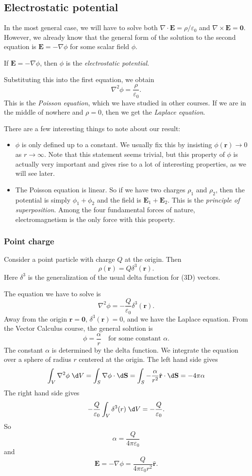 \documentclass[a4paper]{article}
\begin{document}
\subsection{Electrostatic potential}
In the most general case, we will have to solve both $\nabla \cdot \mathbf{E} = \rho/\varepsilon_0$ and $\nabla \times \mathbf{E} = \mathbf{0}$. However, we already know that the general form of the solution to the second equation is $\mathbf{E} = -\nabla\phi$ for some scalar field $\phi$.
\begin{defi}
  If $\mathbf{E} = -\nabla \phi$, then $\phi$ is the \emph{electrostatic potential}.
\end{defi}
Substituting this into the first equation, we obtain
\[
  \nabla^2\phi = \frac{\rho}{\varepsilon_0}.
\]
This is the \emph{Poisson equation}, which we have studied in other courses. If we are in the middle of nowhere and $\rho = 0$, then we get the \emph{Laplace equation}.

There are a few interesting things to note about our result:
\begin{itemize}
  \item $\phi$ is only defined up to a constant. We usually fix this by insisting $\phi(\mathbf{r}) \to 0$ as $r\to \infty$. Note that this statement seems trivial, but this property of $\phi$ is actually very important and gives rise to a lot of interesting properties, as we will see later.
  \item The Poisson equation is linear. So if we have two charges $\rho_1$ and $\rho_2$, then the potential is simply $\phi_1 + \phi_2$ and the field is $\mathbf{E}_1 + \mathbf{E}_2$. This is the \emph{principle of superposition}. Among the four fundamental forces of nature, electromagnetism is the only force with this property.
\end{itemize}
\subsubsection{Point charge}
Consider a point particle with charge $Q$ at the origin. Then
\[
  \rho (\mathbf{r}) = Q\delta^3(\mathbf{r}).
\]
Here $\delta^3$ is the generalization of the usual delta function for (3D) vectors.

The equation we have to solve is
\[
  \nabla^2\phi = -\frac{Q}{\varepsilon_0}\delta^3(\mathbf{r}).
\]
Away from the origin $\mathbf{r} = \mathbf{0}$, $\delta^3(\mathbf{r}) = 0$, and we have the Laplace equation. From the Vector Calculus course, the general solution is
\[
  \phi = \frac{\alpha}{r}\quad \text{for some constant }\alpha.
\]
The constant $\alpha$ is determined by the delta function. We integrate the equation over a sphere of radius $r$ centered at the origin. The left hand side gives
\[
  \int_V \nabla^2\phi\;\d V = \int_S \nabla\phi\cdot\d \mathbf{S} = \int_S -\frac{\alpha}{r^2} \hat{\mathbf{r}}\cdot \d \mathbf{S} = -4\pi\alpha
\]
The right hand side gives
\[
  -\frac{Q}{\varepsilon_0}\int_V\delta^3(r)\; \d V = -\frac{Q}{\varepsilon_0}.
\]
So
\[
  \alpha = \frac{Q}{4\pi \varepsilon_0}
\]
and
\[
  \mathbf{E} = -\nabla \phi = \frac{Q}{4\pi\varepsilon_0 r^2}\hat{\mathbf{r}}.
\]
\end{document}
